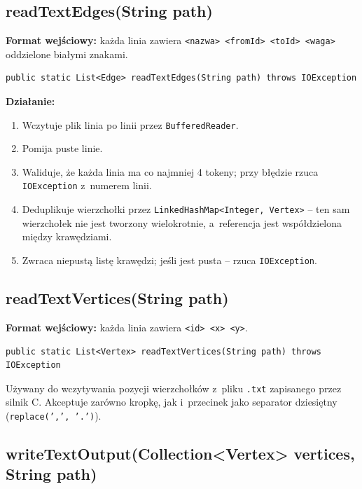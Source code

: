 \documentclass[12pt]{article}
\begin{document}
\subsection{readTextEdges(String path)}

\textbf{Format wejściowy:} każda linia zawiera
\texttt{<nazwa> <fromId> <toId> <waga>} oddzielone białymi znakami.

\begin{lstlisting}
public static List<Edge> readTextEdges(String path) throws IOException
\end{lstlisting}

\textbf{Działanie:}
\begin{enumerate}
    \item Wczytuje plik linia po linii przez \texttt{BufferedReader}.
    \item Pomija puste linie.
    \item Waliduje, że każda linia ma co najmniej 4 tokeny; przy błędzie
          rzuca \texttt{IOException} z~numerem linii.
    \item Deduplikuje wierzchołki przez \texttt{LinkedHashMap<Integer, Vertex>}
          -- ten sam wierzchołek nie jest tworzony wielokrotnie, a~referencja
          jest współdzielona między krawędziami.
    \item Zwraca niepustą listę krawędzi; jeśli jest pusta -- rzuca
          \texttt{IOException}.
\end{enumerate}

\subsection{readTextVertices(String path)}

\textbf{Format wejściowy:} każda linia zawiera \texttt{<id> <x> <y>}.

\begin{lstlisting}
public static List<Vertex> readTextVertices(String path) throws IOException
\end{lstlisting}

Używany do wczytywania pozycji wierzchołków z~pliku \texttt{.txt} zapisanego
przez silnik C. Akceptuje zarówno kropkę, jak i~przecinek jako separator
dziesiętny (\texttt{replace(',', '.')}).

\subsection{writeTextOutput(Collection<Vertex> vertices, String path)}
\end{document}
